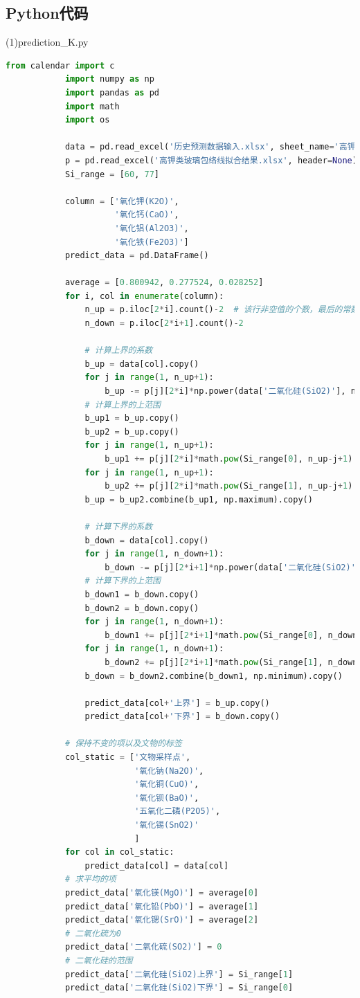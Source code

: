 \documentclass[withoutpreface,bwprint]{cumcmthesis}
\begin{document}
\begin{appendices}
		\subsection{Python代码}

		(1)prediction\_K.py 
		\begin{lstlisting}[language=Python]
			from calendar import c
			import numpy as np
			import pandas as pd
			import math
			import os
			
			data = pd.read_excel('历史预测数据输入.xlsx', sheet_name='高钾风化待预测')
			p = pd.read_excel('高钾类玻璃包络线拟合结果.xlsx', header=None)  # p为待拟合的参数
			Si_range = [60, 77]
			
			column = ['氧化钾(K2O)',
					  '氧化钙(CaO)',
					  '氧化铝(Al2O3)',
					  '氧化铁(Fe2O3)']
			predict_data = pd.DataFrame()
			
			average = [0.800942, 0.277524, 0.028252]
			for i, col in enumerate(column):
				n_up = p.iloc[2*i].count()-2  # 该行非空值的个数，最后的常数项重新计算
				n_down = p.iloc[2*i+1].count()-2
			
				# 计算上界的系数
				b_up = data[col].copy()
				for j in range(1, n_up+1):
					b_up -= p[j][2*i]*np.power(data['二氧化硅(SiO2)'], n_up-j+1)
				# 计算上界的上范围
				b_up1 = b_up.copy()
				b_up2 = b_up.copy()
				for j in range(1, n_up+1):
					b_up1 += p[j][2*i]*math.pow(Si_range[0], n_up-j+1)
				for j in range(1, n_up+1):
					b_up2 += p[j][2*i]*math.pow(Si_range[1], n_up-j+1)
				b_up = b_up2.combine(b_up1, np.maximum).copy()
			
				# 计算下界的系数
				b_down = data[col].copy()
				for j in range(1, n_down+1):
					b_down -= p[j][2*i+1]*np.power(data['二氧化硅(SiO2)'], n_down-j+1)
				# 计算下界的上范围
				b_down1 = b_down.copy()
				b_down2 = b_down.copy()
				for j in range(1, n_down+1):
					b_down1 += p[j][2*i+1]*math.pow(Si_range[0], n_down-j+1)
				for j in range(1, n_down+1):
					b_down2 += p[j][2*i+1]*math.pow(Si_range[1], n_down-j+1)
				b_down = b_down2.combine(b_down1, np.minimum).copy()
			
				predict_data[col+'上界'] = b_up.copy()
				predict_data[col+'下界'] = b_down.copy()
			
			# 保持不变的项以及文物的标签
			col_static = ['文物采样点',
						  '氧化钠(Na2O)',
						  '氧化铜(CuO)',
						  '氧化钡(BaO)',
						  '五氧化二磷(P2O5)',
						  '氧化锡(SnO2)'
						  ]
			for col in col_static:
				predict_data[col] = data[col]
			# 求平均的项
			predict_data['氧化镁(MgO)'] = average[0]
			predict_data['氧化铅(PbO)'] = average[1]
			predict_data['氧化锶(SrO)'] = average[2]
			# 二氧化硫为0
			predict_data['二氧化硫(SO2)'] = 0
			# 二氧化硅的范围
			predict_data['二氧化硅(SiO2)上界'] = Si_range[1]
			predict_data['二氧化硅(SiO2)下界'] = Si_range[0]
			

\end{lstlisting}
\end{appendices}
\end{document}
